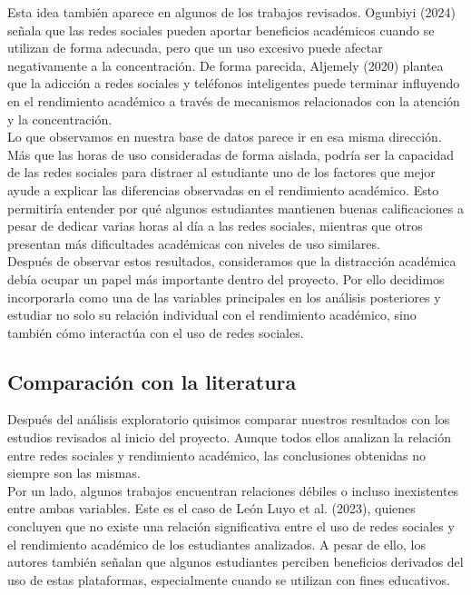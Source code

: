 \documentclass[12pt]{article}
\begin{document}
Esta idea también aparece en algunos de los trabajos revisados. Ogunbiyi (2024) señala que las redes sociales pueden aportar beneficios académicos cuando se utilizan de forma adecuada, pero que un uso excesivo puede afectar negativamente a la concentración. De forma parecida, Aljemely (2020) plantea que la adicción a redes sociales y teléfonos inteligentes puede terminar influyendo en el rendimiento académico a través de mecanismos relacionados con la atención y la concentración.
\\

Lo que observamos en nuestra base de datos parece ir en esa misma dirección. Más que las horas de uso consideradas de forma aislada, podría ser la capacidad de las redes sociales para distraer al estudiante uno de los factores que mejor ayude a explicar las diferencias observadas en el rendimiento académico. Esto permitiría entender por qué algunos estudiantes mantienen buenas calificaciones a pesar de dedicar varias horas al día a las redes sociales, mientras que otros presentan más dificultades académicas con niveles de uso similares.
\\

Después de observar estos resultados, consideramos que la distracción académica debía ocupar un papel más importante dentro del proyecto. Por ello decidimos incorporarla como una de las variables principales en los análisis posteriores y estudiar no solo su relación individual con el rendimiento académico, sino también cómo interactúa con el uso de redes sociales.

\subsection{Comparación con la literatura}

Después del análisis exploratorio quisimos comparar nuestros resultados con los estudios revisados al inicio del proyecto. Aunque todos ellos analizan la relación entre redes sociales y rendimiento académico, las conclusiones obtenidas no siempre son las mismas.
\\
Por un lado, algunos trabajos encuentran relaciones débiles o incluso inexistentes entre ambas variables. Este es el caso de León Luyo et al. (2023), quienes concluyen que no existe una relación significativa entre el uso de redes sociales y el rendimiento académico de los estudiantes analizados. A pesar de ello, los autores también señalan que algunos estudiantes perciben beneficios derivados del uso de estas plataformas, especialmente cuando se utilizan con fines educativos.
\\
\end{document}
